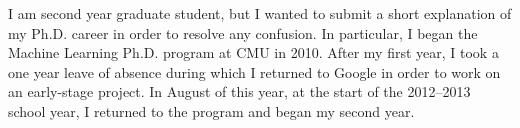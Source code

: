 \documentclass[12pt]{article}
\begin{document}
I am second year graduate student, but I wanted to submit a short explanation of my Ph.D. career in order to resolve any confusion. In particular, I began the Machine Learning Ph.D. program at CMU in 2010. After my first year, I took a one year leave of absence during which I returned to Google in order to work on an early-stage project. In August of this year, at the start of the 2012--2013 school year, I returned to the program and began my second year.
\end{document}
